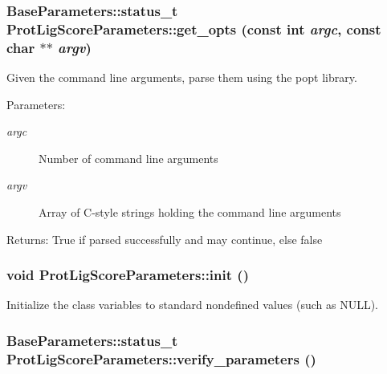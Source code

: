 \subsubsection{\setlength{\rightskip}{0pt plus 5cm}Base\-Parameters::status\_\-t Prot\-Lig\-Score\-Parameters::get\_\-opts (const int {\em argc}, const char $\ast$$\ast$ {\em argv})\hspace{0.3cm}{\tt  [private]}}\label{classASCbase_1_1ProtLigScoreParameters_586a96295f8218894484a4e67a903ece}


Given the command line arguments, parse them using the popt library. 

\begin{Desc}
\item[Parameters:]
\begin{description}
\item[{\em argc}]Number of command line arguments \item[{\em argv}]Array of C-style strings holding the command line arguments \end{description}
\end{Desc}
\begin{Desc}
\item[Returns:]True if parsed successfully and may continue, else false \end{Desc}
\subsubsection{\setlength{\rightskip}{0pt plus 5cm}void Prot\-Lig\-Score\-Parameters::init ()\hspace{0.3cm}{\tt  [private]}}\label{classASCbase_1_1ProtLigScoreParameters_71e62166bebd8b6192f7910fe3e30acb}


Initialize the class variables to standard nondefined values (such as NULL). 
\subsubsection{\setlength{\rightskip}{0pt plus 5cm}Base\-Parameters::status\_\-t Prot\-Lig\-Score\-Parameters::verify\_\-parameters ()\hspace{0.3cm}{\tt  [private]}}\label{classASCbase_1_1ProtLigScoreParameters_84006aef52335c65ce3c9e41eca9282d}


